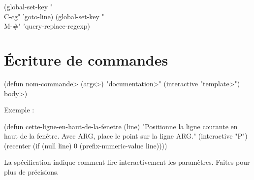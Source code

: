 \beginexample%
(global-set-key "\\C-cg" 'goto-line)
(global-set-key "\\M-\#" 'query-replace-regexp)
\endexample

\section{\'Ecriture de commandes}

\beginexample%
(defun \<nom-commande> (\<args>)
  "\<documentation>"
  (interactive "\<template>")
  \<body>)
\endexample

Exemple :

\beginexample%
(defun cette-ligne-en-haut-de-la-fenetre (line)
  "Positionne la ligne courante en haut de la fen\^etre.
Avec ARG, place le point sur la ligne ARG."
  (interactive "P")
  (recenter (if (null line)
                0
              (prefix-numeric-value line))))
\endexample

La sp\'ecification  indique comment lire
interactivement les param\`etres. Faites  pour
plus de pr\'ecisions.

\copyrightnotice

\bye


